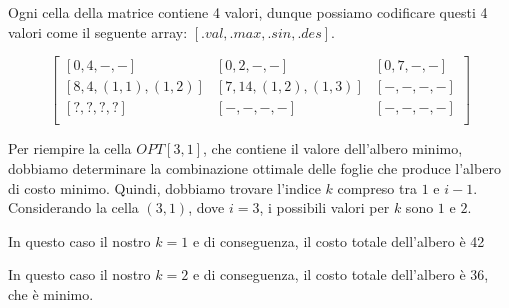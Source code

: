 Ogni cella della matrice contiene 4 valori, dunque possiamo codificare questi 4 valori come 
il seguente array: $[.val, .max, .sin, .des]$.

\[
	\begin{bmatrix}
		[0, 4, -, -]           & [0, 2, -, -]            & [0, 7, -, -] \\
		[8, 4, (1, 1), (1, 2)] & [7, 14, (1, 2), (1, 3)] & [-, -, -, -] \\
		[?, ?, ?, ?]           & [-, -, -, -]            & [-, -, -, -] \\
	\end{bmatrix}
\]

Per riempire la cella $OPT[3, 1]$, che contiene il valore dell'albero minimo, 
dobbiamo determinare la combinazione ottimale delle foglie che produce l'albero di costo minimo. 
Quindi, dobbiamo trovare l'indice $k$ compreso tra $1$ e $i - 1$. Considerando la cella $(3, 1)$, 
dove $i = 3$, i possibili valori per $k$ sono $1$ e $2$.


\begin{center}
	\begin{enumerate*}[label={}]
	\item {
	}
	\newline
	\item{
	      In questo caso il nostro $k = 1$ e di conseguenza, il costo totale dell'albero è 42
	}
\end{enumerate*}
\end{center}


\begin{center}	
\begin{enumerate*}[label={}]
	\item {
	}
	\newline
	\item{
	      In questo caso il nostro $k = 2$ e di conseguenza, il costo totale dell'albero è 36, che è minimo.
	}
\end{enumerate*}
\end{center}


